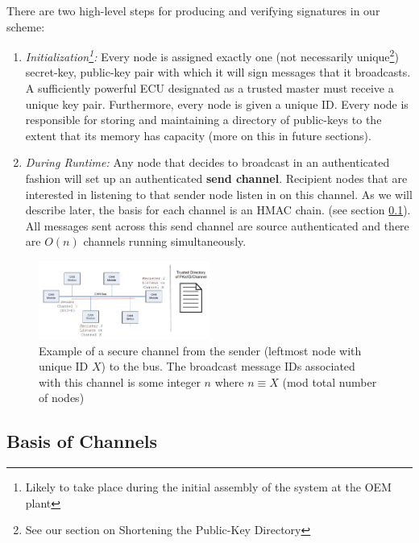 \documentclass{article}
\begin{document}
    There are two high-level steps for producing and verifying signatures in our scheme:\\
    
    \begin{enumerate}
    \item \textit{Initialization\footnote{Likely to take place during the initial assembly of the system at the OEM plant}:} Every node is assigned exactly one (not necessarily unique\footnote{See our section on Shortening the Public-Key Directory}) secret-key, public-key pair with which it will sign messages that it broadcasts. A sufficiently powerful ECU designated as a trusted master must receive a unique key pair. Furthermore, every node is given a unique ID. Every node is responsible for storing and maintaining a directory of public-keys to the extent that its memory has capacity (more on this in future sections).\\
    
    \item \textit{During Runtime:} Any node that decides to broadcast in an authenticated fashion will set up an authenticated \textbf{send channel}. Recipient nodes that are interested in listening to that sender node listen in on this channel. As we will describe later, the basis for each channel is an HMAC chain. (see section \ref{sec:hmac}). All messages sent across this send channel are source authenticated and there are  $O(n)$ channels running simultaneously. 
    \end{enumerate}
    
\begin{figure}[h]
  \centering
  \includegraphics[width=0.5\textwidth]{channelX}
  \caption {Example of a secure channel from the sender (leftmost node with unique ID $X$) to the bus. The broadcast message IDs associated with this channel is some integer $n$ where $n\equiv X$ (mod total number of nodes)}
\end{figure}
    
    \subsection{Basis of Channels}
    \label{sec:hmac}
    
\end{document}
